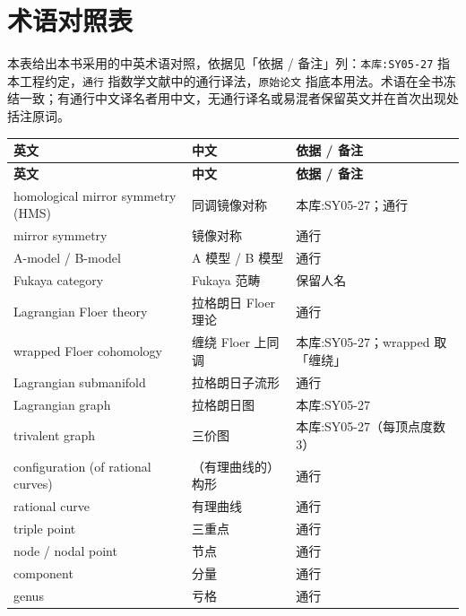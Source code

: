 \section{术语对照表}\label{app:terms}

本表给出本书采用的中英术语对照，依据见「依据 / 备注」列：\texttt{本库:SY05-27} 指本工程约定，\texttt{通行} 指数学文献中的通行译法，\texttt{原始论文} 指底本用法。术语在全书冻结一致；有通行中文译名者用中文，无通行译名或易混者保留英文并在首次出现处括注原词。

\begingroup
\small
\begin{longtable}{@{}p{}p{}p{}@{}}
\toprule
\textbf{英文} & \textbf{中文} & \textbf{依据 / 备注}\\
\midrule
\endfirsthead
\toprule
\textbf{英文} & \textbf{中文} & \textbf{依据 / 备注}\\
\midrule
\endhead
\bottomrule
\endfoot
homological mirror symmetry (HMS) & 同调镜像对称 & 本库:SY05-27；通行 \\
\midrule
mirror symmetry & 镜像对称 & 通行 \\
\midrule
A-model / B-model & A 模型 / B 模型 & 通行 \\
\midrule
Fukaya category & Fukaya 范畴 & 保留人名 \\
\midrule
Lagrangian Floer theory & 拉格朗日 Floer 理论 & 通行 \\
\midrule
wrapped Floer cohomology & 缠绕 Floer 上同调 & 本库:SY05-27；wrapped 取「缠绕」 \\
\midrule
Lagrangian submanifold & 拉格朗日子流形 & 通行 \\
\midrule
Lagrangian graph & 拉格朗日图 & 本库:SY05-27 \\
\midrule
trivalent graph & 三价图 & 本库:SY05-27（每顶点度数 3） \\
\midrule
configuration (of rational curves) & （有理曲线的）构形 & 通行 \\
\midrule
rational curve & 有理曲线 & 通行 \\
\midrule
triple point & 三重点 & 通行 \\
\midrule
node / nodal point & 节点 & 通行 \\
\midrule
component & 分量 & 通行 \\
\midrule
genus & 亏格 & 通行 \\

\end{longtable}
